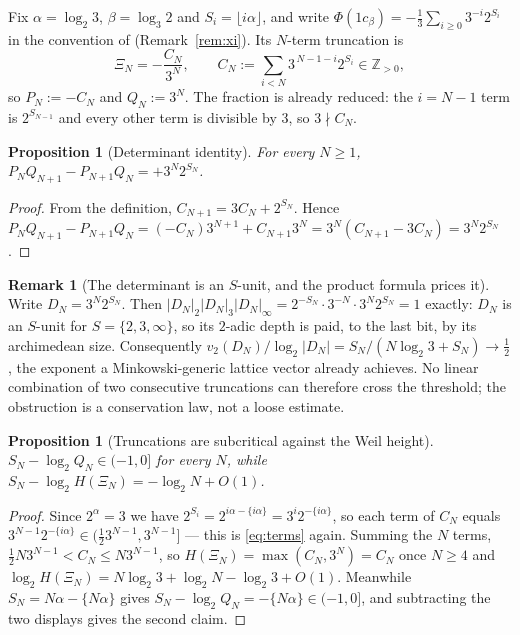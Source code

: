 \documentclass[11pt,reqno]{amsart}
\theoremstyle{plain}
\newtheorem{proposition}[theorem]{Proposition}
\theoremstyle{definition}
\newtheorem{remark}[theorem]{Remark}
\newcommand{\Z}{\mathbb{Z}}
\newcommand{\PH}{\Phi}
\newcommand{\vtwo}{v_2}
\begin{document}
Fix $\alpha=\log_2 3$, $\beta=\log_3 2$ and $S_i=\lfloor i\alpha\rfloor$, and write
$\PH(1c_\beta)=-\frac13\sum_{i\ge0}3^{-i}2^{S_i}$ in the convention of
\cite[Theorem 4.1]{DJedge} (Remark~\ref{rem:xi}). Its $N$-term truncation is
\[
  \Xi_N=-\frac{C_N}{3^{N}},\qquad C_N:=\sum_{i<N}3^{\,N-1-i}2^{S_i}\in\Z_{>0},
\]
so $P_N:=-C_N$ and $Q_N:=3^{N}$. The fraction is already reduced: the $i=N-1$ term is $2^{S_{N-1}}$
and every other term is divisible by $3$, so $3\nmid C_N$.

\begin{proposition}[Determinant identity]\label{prop:det}
For every $N\ge1$,\; $P_NQ_{N+1}-P_{N+1}Q_N=+3^{N}2^{S_N}$.
\end{proposition}

\begin{proof}
From the definition, $C_{N+1}=3C_N+2^{S_N}$. Hence
$P_NQ_{N+1}-P_{N+1}Q_N=(-C_N)3^{N+1}+C_{N+1}3^{N}=3^{N}(C_{N+1}-3C_N)=3^{N}2^{S_N}$.
\end{proof}

\begin{remark}[The determinant is an $S$-unit, and the product formula prices it]\label{rem:sunit}
Write $D_N=3^{N}2^{S_N}$. Then $|D_N|_2|D_N|_3|D_N|_\infty=2^{-S_N}\cdot3^{-N}\cdot3^{N}2^{S_N}=1$
exactly: $D_N$ is an $S$-unit for $S=\{2,3,\infty\}$, so its $2$-adic depth is paid, to the last
bit, by its archimedean size. Consequently
$\vtwo(D_N)/\log_2|D_N|=S_N/(N\log_2 3+S_N)\to\frac12$, the exponent a Minkowski-generic lattice
vector already achieves. No linear combination of two consecutive truncations can therefore cross
the threshold; the obstruction is a conservation law, not a loose estimate.
\end{remark}

\begin{proposition}[Truncations are subcritical against the Weil height]\label{prop:trunc}
$S_N-\log_2 Q_N\in(-1,0]$ for every $N$, while $S_N-\log_2 H(\Xi_N)=-\log_2 N+O(1)$.
\end{proposition}

\begin{proof}
Since $2^{\alpha}=3$ we have $2^{S_i}=2^{i\alpha-\{i\alpha\}}=3^{i}2^{-\{i\alpha\}}$, so each term of
$C_N$ equals $3^{N-1}2^{-\{i\alpha\}}\in(\tfrac12 3^{N-1},3^{N-1}]$ --- this is \eqref{eq:terms}
again. Summing the $N$ terms, $\tfrac12N3^{N-1}<C_N\le N3^{N-1}$, so
$H(\Xi_N)=\max(C_N,3^{N})=C_N$ once $N\ge4$ and
$\log_2 H(\Xi_N)=N\log_2 3+\log_2 N-\log_2 3+O(1)$. Meanwhile $S_N=N\alpha-\{N\alpha\}$ gives
$S_N-\log_2 Q_N=-\{N\alpha\}\in(-1,0]$, and subtracting the two displays gives the second claim.
\end{proof}
\end{document}
